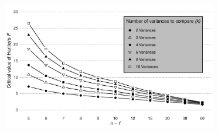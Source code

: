 \begin{raggedleft}
\hspace{7cm}
\includegraphics[height = 5.6cm]{Files/Images/HartleysF.pdf}
\end{raggedleft}

\clearpage %